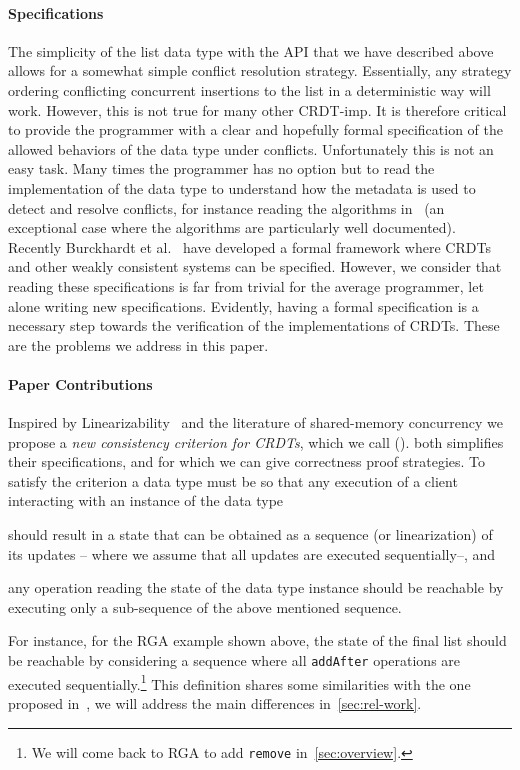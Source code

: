 \paragraph{Specifications}
The simplicity of the list data type with the API that we have
described above allows for a somewhat simple conflict resolution
strategy.
%
Essentially, any strategy ordering conflicting concurrent insertions
to the list in a deterministic way will work.
%
However, this is not true for many other CRDT-imp.
%
It is therefore critical to provide the programmer with a clear and
hopefully formal specification of the allowed behaviors of the data
type under conflicts.
%
Unfortunately this is not an easy task.
%
Many times the programmer has no option but to read the implementation
of the data type to understand how the metadata is used to detect and
resolve conflicts, for instance reading the algorithms
in~\cite{ShapiroPBZ11} (an exceptional case where the algorithms are
particularly well documented).
%
Recently Burckhardt et al.~\cite{BurckhardtGYZ14, Burckhardt14} have
developed a formal framework where CRDTs and other weakly
consistent systems can be specified.
%
However, we consider that reading these specifications is far from
trivial for the average programmer, let alone writing new
specifications.
%
Evidently, having a formal specification is a necessary step towards
the verification of the implementations of CRDTs.
%
These are the problems we address in this paper.

\paragraph{Paper Contributions}

Inspired by Linearizability~\cite{HerlihyW90} and the literature of
shared-memory concurrency we propose a \emph{new consistency criterion
  for CRDTs}, which we call \emph{\CRDTLin{}} (\CRDTLinshort{}).
%
\CRDTLinshort{} both simplifies their specifications, and for which we
can give correctness proof strategies.
%
To satisfy the \CRDTLinshort{} criterion a data type must be so that
any execution of a client interacting with an instance of the data
type
\begin{inparaenum}
\item should result in a state that can be obtained as a sequence (or
  linearization) of its updates -- where we assume that all updates
  are executed sequentially--, and
\item any operation reading the state of the data type instance should
  be reachable by executing only a sub-sequence of the above mentioned
  sequence.
\end{inparaenum}
For instance, for the RGA example shown above, the state of the final
list should be reachable by considering a sequence where all
\lstinline|addAfter| operations are executed sequentially.\footnote{We
  will come back to RGA to add \lstinline|remove|
  in~\autoref{sec:overview}.}
%
This definition shares some similarities with the one proposed
in~\cite{PerrinMJ14}, we will address the main differences
in~\autoref{sec:rel-work}.

